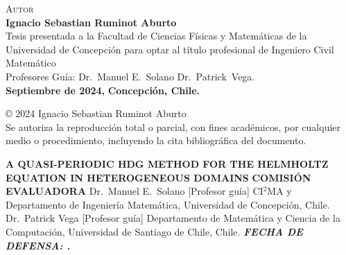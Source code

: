 \documentclass[13pt,letterpaper,hidelinks]{book}
\begin{document}
\begin{titlepage}
\vspace{1cm}
\textsc{\large Autor}\\[0.3cm]
\Large{\bf Ignacio Sebastian Ruminot Aburto}\\
\vspace{2cm}
Tesis presentada a la Facultad de Ciencias F\'isicas y Matem\'aticas de la
Universidad de Concepci\'on para optar al t\'itulo profesional de
Ingeniero Civil Matem\'atico\\[0.5cm]
{Profesores Gu\'ia: Dr.~Manuel E.~Solano Dr.~Patrick~Vega.}\\[0.5cm]
{\bf Septiembre de 2024,}
{\bf Concepci\'on, Chile.}
\end{titlepage}

\clearpage
\setcounter{page}{1}
\thispagestyle{plain}
\hspace{1mm}
\vfill
\centering
{\copyright\hspace{1mm} 2024 Ignacio Sebastian Ruminot Aburto}\\[0.6cm]
{Se autoriza la reproducci\'on total o parcial, con fines}
{acad\'emicos, por cualquier medio o procedimiento,}
{incluyendo la cita bibliogr\'afica del documento.}

\clearpage
\thispagestyle{plain}
\center
{\bf \Large A QUASI-PERIODIC HDG METHOD FOR THE HELMHOLTZ EQUATION IN HETEROGENEOUS DOMAINS}
\vspace{1cm}
\justifying
\vspace{2.5cm}
{\bf \large COMISI\'ON EVALUADORA}
\vspace{1cm}
{Dr.~Manuel E.~Solano [Profesor gu\'ia]}
{CI$^2$MA y Departamento de Ingenier\'ia Matem\'atica, Universidad de Concepción, Chile.} 
\vspace{0.05cm}
{Dr.~Patrick Vega [Profesor gu\'ia]}
{Departamento de Matemática y Ciencia de la Computación, Universidad de Santiago de Chile, Chile.}
\vspace{0.2cm}
\vspace{0.2cm}
\vspace{0.2cm}
{\it\bf FECHA DE DEFENSA: .}


\clearpage
\thispagestyle{plain}
\end{document}
